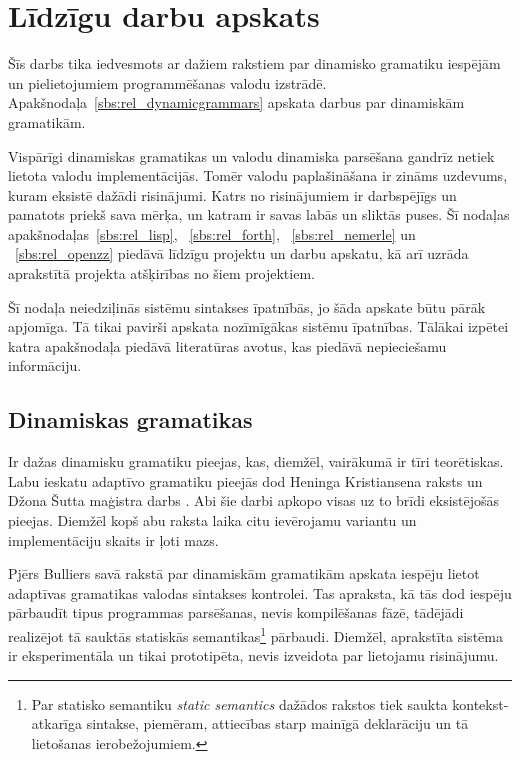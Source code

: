 \section{\label{s:related}Līdzīgu darbu apskats}

Šīs darbs tika iedvesmots ar dažiem rakstiem par dinamisko gramatiku iespējām un pielietojumiem programmēšanas valodu izstrādē. Apakšnodaļa~\ref{sbs:rel_dynamicgrammars} apskata darbus par dinamiskām gramatikām. 

Vispārīgi dinamiskas gramatikas un valodu dinamiska parsēšana gandrīz netiek lietota valodu implementācijās. Tomēr valodu paplašināšana ir zināms uzdevums, kuram eksistē dažādi risinājumi. Katrs no risinājumiem ir darbspējīgs un pamatots priekš sava mērķa, un katram ir savas labās un sliktās puses. Šī nodaļas apakšnodaļas~\ref{sbs:rel_lisp}, ~\ref{sbs:rel_forth}, ~\ref{sbs:rel_nemerle} un ~\ref{sbs:rel_openzz} piedāvā līdzīgu projektu un darbu apskatu, kā arī uzrāda aprakstītā projekta atšķirības no šiem projektiem.

Šī nodaļa neiedziļinās sistēmu sintakses īpatnībās, jo šāda apskate būtu pārāk apjomīga. Tā tikai pavirši apskata nozīmīgākas sistēmu īpatnības. Tālākai izpētei katra apakšnodaļa piedāvā literatūras avotus, kas piedāvā nepieciešamu informāciju.

\subsection{\label{sbs:rel_dynamicgrammars}Dinamiskas gramatikas}

Ir dažas dinamisku gramatiku pieejas, kas, diemžēl, vairākumā ir tīri teorētiskas. Labu ieskatu adaptīvo gramatiku pieejās dod Heninga Kristiansena raksts \cite{Christiansen:SurveyAdaptableGrammars} un Džona Šutta maģistra darbs \cite{Shutt:AdaptiveGrammars}. Abi šie darbi apkopo visas uz to brīdi eksistējošās pieejas. Diemžēl kopš abu raksta laika citu ievērojamu variantu un implementāciju skaits ir ļoti mazs.

Pjērs Bulliers savā rakstā par dinamiskām gramatikām \cite{Boullier:DynamicGrammars} apskata iespēju lietot adaptīvas gramatikas valodas sintakses kontrolei. Tas apraksta, kā tās dod iespēju pārbaudīt tipus programmas parsēšanas, nevis kompilēšanas fāzē, tādējādi realizējot tā sauktās statiskās semantikas\footnote{Par statisko semantiku \emph{static semantics} dažādos rakstos tiek saukta kontekst-atkarīga sintakse, piemēram, attiecības starp mainīgā deklarāciju un tā lietošanas ierobežojumiem.} pārbaudi. Diemžēl, aprakstīta sistēma ir eksperimentāla un tikai prototipēta, nevis izveidota par lietojamu risinājumu.

